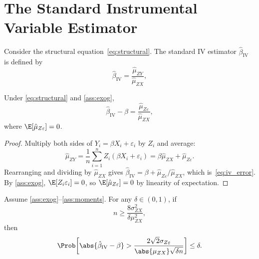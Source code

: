 \section{The Standard Instrumental Variable Estimator}
\label{sec:standard_iv}

\begin{definition}
    Consider the structural equation~\eqref{eq:structural}. The standard IV estimator
    $\hat{\beta}_{\mathrm{IV}}$ is defined by
    \[
        \hat{\beta}_{\mathrm{IV}} = \frac{\hat{\mu}_{ZY}}{\hat{\mu}_{ZX}},
    \]
\end{definition}

\begin{lemma}
    \label{lem:iv_decomp}
    Under \eqref{eq:structural} and \ref{ass:exog},
    \begin{equation}
    \label{eq:iv_error}
        \hat{\beta}_{\mathrm{IV}} - \beta = \frac{\hat{\mu}_{Z\varepsilon}}{\hat{\mu}_{ZX}},
    \end{equation}
    where $\E[\hat{\mu}_{Z\varepsilon}] = 0$.
\end{lemma}

\begin{proof}
    Multiply both sides of $Y_i = \beta X_i + \varepsilon_i$ by $Z_i$ and average:
    \[
        \hat{\mu}_{ZY}
        = \frac{1}{n}\sum_{i=1}^{n}Z_i(\beta X_i + \varepsilon_i)
        = \beta\hat{\mu}_{ZX} + \hat{\mu}_{Z\varepsilon}.
    \]
    Rearranging and dividing by $\hat{\mu}_{ZX}$ gives $\hat{\beta}_{\mathrm{IV}} = \beta + \hat{\mu}_{Z\varepsilon}/\hat{\mu}_{ZX}$, which is~\eqref{eq:iv_error}. By \ref{ass:exog}, $\E[Z_i\varepsilon_i] = 0$, so $\E[\hat{\mu}_{Z\varepsilon}] = 0$ by linearity of expectation.
\end{proof}

\begin{theorem}
\label{thm:iv}
    Assume \ref{ass:exog}--\ref{ass:moments}. For any $\delta \in (0,1)$, if
    \begin{equation}
        \label{eq:iv_strength}
            n \geq \frac{8\sigma_{ZX}^2}{\delta \mu_{ZX}^2},
    \end{equation}
    then
    \begin{equation}
    \label{eq:iv_bound}
        \Prob\!\left[\abs{\hat{\beta}_{\mathrm{IV}} - \beta}
            > \frac{2\sqrt{2}\sigma_{Z\varepsilon}}{\abs{\mu_{ZX}}\sqrt{\delta n}}
            \right] \leq \delta.
    \end{equation}
\end{theorem}

